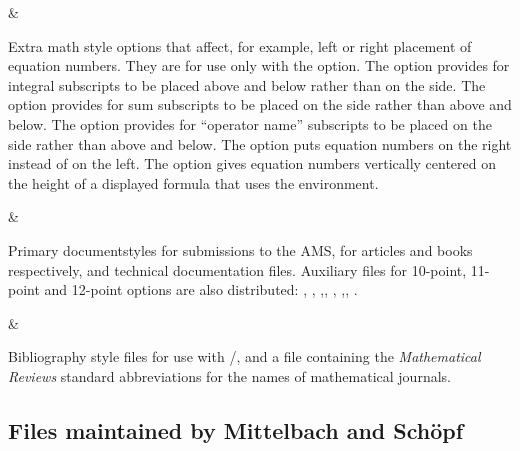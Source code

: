 \begin{filelist}
\newline {}\newline
{}\newline {}\newline
{}&

Extra math style options that affect, for example, left or right
placement of equation numbers.  They are for use only with
the  option. The  option provides for
integral subscripts to be placed above and below rather than on the
side. The  option provides for sum subscripts to be
placed on the side rather than above and below. The 
option provides for ``operator name'' subscripts to be placed on the
side rather than above and below. The  option puts
equation numbers on the right instead of on the left. The
 option gives equation numbers  vertically centered on
the height of a displayed formula that uses the 
environment.
\end{filelist}

\begin{filelist}
\newline {}\newline
{}\newline {}&

Primary documentstyles for submissions to the AMS, for articles and
books respectively, and technical documentation files.
Auxiliary files for 10-point, 11-point and
12-point options are also distributed: ,
, ,\newline {},
, ,\newline {},
.\sloppy{}
\end{filelist}

\begin{filelist}
\newline {}\newline {}&

Bibliography style files for use with \bibtex/, and a file
containing the {\it Mathematical Reviews\/} standard abbreviations
for the names of mathematical journals.
\end{filelist}

\subsection{Files maintained by Mittelbach and Sch\"opf}


